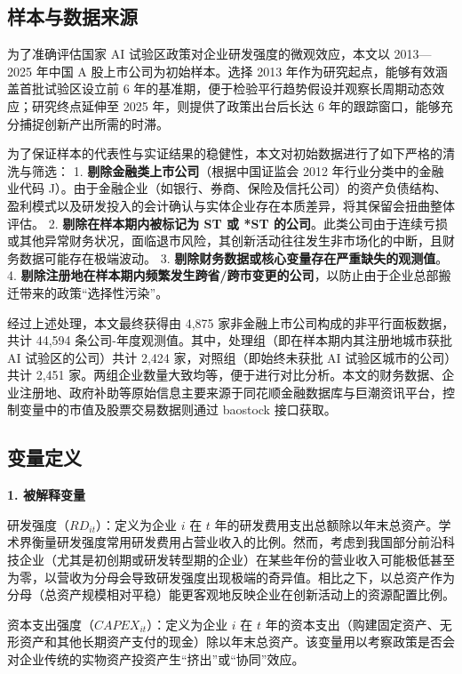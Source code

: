 \documentclass[12pt,hyperref,a4paper,UTF8]{ctexart}
\begin{document}
\subsection{样本与数据来源}

为了准确评估国家 AI 试验区政策对企业研发强度的微观效应，本文以 2013—2025 年中国 A 股上市公司为初始样本。选择 2013 年作为研究起点，能够有效涵盖首批试验区设立前 6 年的基准期，便于检验平行趋势假设并观察长周期动态效应；研究终点延伸至 2025 年，则提供了政策出台后长达 6 年的跟踪窗口，能够充分捕捉创新产出所需的时滞。

为了保证样本的代表性与实证结果的稳健性，本文对初始数据进行了如下严格的清洗与筛选：
1. \textbf{剔除金融类上市公司}（根据中国证监会 2012 年行业分类中的金融业代码 J）。由于金融企业（如银行、券商、保险及信托公司）的资产负债结构、盈利模式以及研发投入的会计确认与实体企业存在本质差异，将其保留会扭曲整体评估。
2. \textbf{剔除在样本期内被标记为 ST 或 *ST 的公司}。此类公司由于连续亏损或其他异常财务状况，面临退市风险，其创新活动往往发生非市场化的中断，且财务数据可能存在极端波动。
3. \textbf{剔除财务数据或核心变量存在严重缺失的观测值}。
4. \textbf{剔除注册地在样本期内频繁发生跨省/跨市变更的公司}，以防止由于企业总部搬迁带来的政策“选择性污染”。

经过上述处理，本文最终获得由 4,875 家非金融上市公司构成的非平行面板数据，共计 44,594 条公司-年度观测值。其中，处理组（即在样本期内其注册地城市获批 AI 试验区的公司）共计 2,424 家，对照组（即始终未获批 AI 试验区城市的公司）共计 2,451 家。两组企业数量大致均等，便于进行对比分析。本文的财务数据、企业注册地、政府补助等原始信息主要来源于同花顺金融数据库与巨潮资讯平台，控制变量中的市值及股票交易数据则通过 baostock 接口获取。

\subsection{变量定义}

\textbf{1. 被解释变量}

研发强度（$RD_{it}$）：定义为企业 $i$ 在 $t$ 年的研发费用支出总额除以年末总资产。学术界衡量研发强度常用研发费用占营业收入的比例。然而，考虑到我国部分前沿科技企业（尤其是初创期或研发转型期的企业）在某些年份的营业收入可能极低甚至为零，以营收为分母会导致研发强度出现极端的奇异值。相比之下，以总资产作为分母（总资产规模相对平稳）能更客观地反映企业在创新活动上的资源配置比例。

资本支出强度（$CAPEX_{it}$）：定义为企业 $i$ 在 $t$ 年的资本支出（购建固定资产、无形资产和其他长期资产支付的现金）除以年末总资产。该变量用以考察政策是否会对企业传统的实物资产投资产生“挤出”或“协同”效应。
\end{document}
